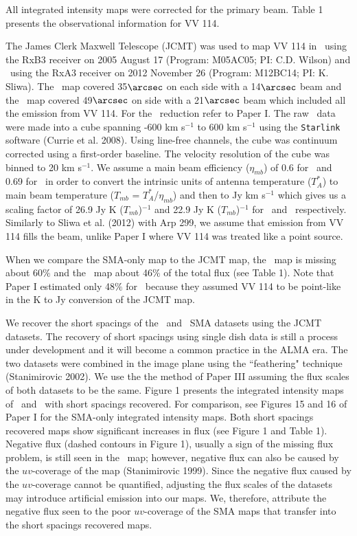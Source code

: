 All integrated intensity maps were corrected for the primary beam. Table 1 presents the observational information for VV 114.


The James Clerk Maxwell Telescope (JCMT) was used to map VV 114 in \cothree\ using the  RxB3 receiver on 2005 August 17 (Program: M05AC05; PI: C.D. Wilson) and \cotwo\ using the RxA3 receiver on 2012 November 26 (Program: M12BC14; PI: K. Sliwa). The \cothree\ map covered 35$\arcsec$ on each side with a 14$\arcsec$ beam and the \cotwo\ map covered 49$\arcsec$ on side with a 21$\arcsec$ beam which included all the emission from VV 114. For the \cothree\ reduction refer to Paper I. The raw \cotwo\ data were made into a cube spanning -600 km s$^{-1}$ to 600 km s$^{-1}$ using the \verb=Starlink= software (Currie et al. 2008)\nocite{2008ASPC..394..650C}. Using line-free channels, the cube was continuum corrected using a first-order baseline. The velocity resolution of the cube was binned to 20 km s$^{-1}$. We assume a main beam efficiency ($\eta_{mb}$) of 0.6 for \cothree\ and 0.69 for \cotwo\ in order to convert the intrinsic units of antenna temperature ($T_{A}^{*}$) to main beam temperature ($T_{mb}$ = $T_{A}^{*}$/$\eta_{mb}$) and then to Jy km s$^{-1}$ which gives us a scaling factor of 26.9 Jy K ($T_{mb}$)$^{-1}$ and 22.9 Jy K ($T_{mb}$)$^{-1}$ for \cothree\ and \cotwo\, respectively. Similarly to Sliwa et al. (2012) with Arp 299, we assume that emission from VV 114 fills the beam, unlike Paper I where VV 114 was treated like a point source. 

When we compare the SMA-only map to the JCMT map, the \cothree\ map is missing about 60$\%$ and the \cotwo\ map about 46$\%$ of the total flux (see Table 1). Note that Paper I estimated only 48$\%$ for \cothree\ because they assumed VV 114 to be point-like in the K to Jy conversion of the JCMT map. 


We recover the short spacings of the \cotwo\ and \cothree\ SMA datasets using the JCMT datasets. The recovery of short spacings using single dish data is still a process under development and it will become a common practice in the ALMA era. The two datasets were combined in the image plane using the ``feathering" technique (Stanimirovic 2002)\nocite{2002ASPC..278..375S}. We use the the method of Paper III assuming the flux scales of both datasets to be the same. Figure 1 presents the integrated intensity maps of \cotwo\ and \cothree\ with short spacings recovered. For comparison, see Figures 15 and 16 of Paper I for the SMA-only integrated intensity maps. Both short spacings recovered maps show significant increases in flux (see Figure 1 and Table 1). Negative flux (dashed contours in Figure 1), usually a sign of the missing flux problem, is still seen in the \cothree\ map; however,  negative flux can also be caused by the $uv$-coverage of the map (Stanimirovic 1999)\nocite{1999PhDT........21S}. Since the negative flux caused by the $uv$-coverage cannot be quantified, adjusting the flux scales of the datasets may introduce artificial emission into our maps. We, therefore, attribute the negative flux seen to the poor $uv$-coverage of the SMA maps that transfer into the short spacings recovered maps. 


